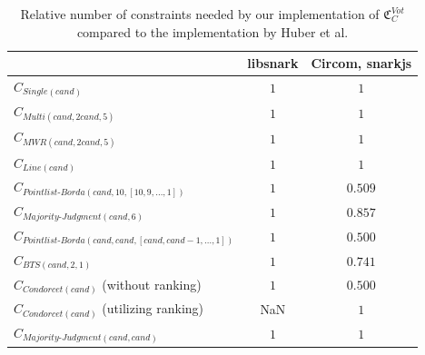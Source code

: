 \begin{table}[h]
    \centering
    \begin{tabular}{|l|c|c|}
        \hline
        & libsnark & Circom, snarkjs\\
        \hline
        \hline
        $C_{Single(cand)}$ & $1$ & $1$\\
        $C_{Multi(cand, 2cand, 5)}$ & $1$ & $1$\\
        $C_{MWR(cand, 2cand, 5)}$ & $1$ & $1$\\
        $C_{Line(cand)}$ & $1$ & $1$\\
        $C_{Pointlist\text{-}Borda(cand, 10, [10,9,\dots, 1])}$ & $1$ & $0.509$\\
        $C_{Majority\text{-}Judgment(cand, 6)}$ & $1$ & $0.857$\\
        \hline
        \hline
        $C_{Pointlist\text{-}Borda(cand, cand, [cand,cand-1,\dots, 1])}$ & $1$ & $0.500$\\
        $C_{BTS(cand, 2, 1)}$ & $1$ & $0.741$\\
        $C_{Condorcet(cand)}$ (without ranking) & $1$ & $0.500$\\
        $C_{Condorcet(cand)}$ (utilizing ranking) & NaN & $1$\\
        $C_{Majority\text{-}Judgment(cand, cand)}$ & $1$ & $1$\\
        \hline
    \end{tabular}
    \caption{Relative number of constraints needed by our implementation of $\mathfrak{C}_{C}^{Vot}$ compared to the implementation by Huber et al.}
    \label{tab:votingResults}
\end{table}

